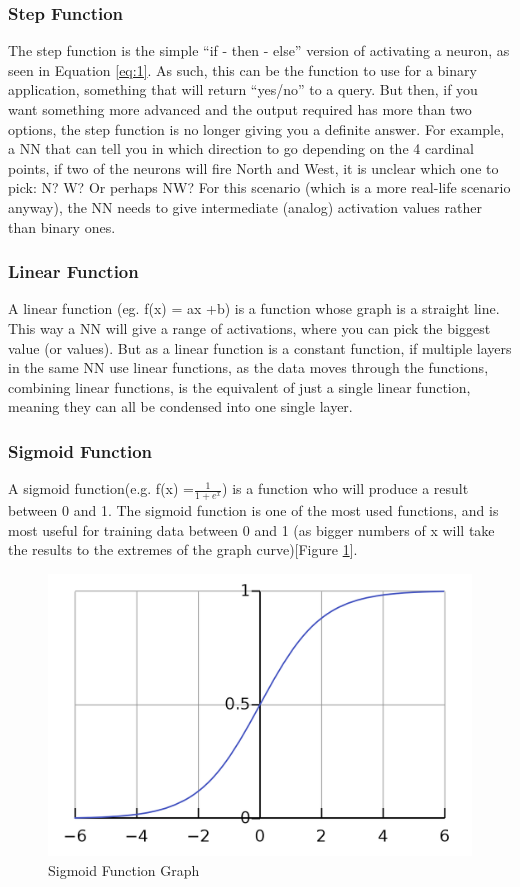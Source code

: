 \documentclass[12pt,a4paper]{article}
\begin{document}
\subsubsection{Step Function}
The step function is the simple “if - then - else” version of activating a neuron, as seen in Equation \ref{eq:1}. As such, this can be the function to use for a binary application,  something that will return “yes/no” to a query. But then, if you want something more advanced and the output required has more than two options, the step function is no longer giving you a definite answer. For example, a NN that can tell you in which direction to go depending on the 4 cardinal points, if two of the neurons will fire North and West, it is unclear which one to pick: N? W? Or perhaps NW? For this scenario (which is a more real-life scenario anyway), the NN needs to give intermediate (analog) activation values rather than binary ones. \cite{sharma_understanding_2017}
\subsubsection{Linear Function}
A linear function (eg. f(x) = ax +b) is a function whose graph is a straight line. This way a NN will give a range of activations, where you can pick the biggest value (or values). But as a linear function is a constant function, if multiple layers in the same NN use linear functions, as the data moves through the functions, combining linear functions, is the equivalent of just a single linear function, meaning they can all be condensed into one single layer.
\subsubsection{Sigmoid Function}
A sigmoid function(e.g. f(x) =\( \frac{1}{1+e^x} \)) is a function who will produce a result between 0 and 1. The sigmoid function is one of the most used functions, and is most useful for training data between 0 and 1 (as bigger numbers of x will take the results to the extremes of the graph curve)[Figure \ref{fig:3}].
\begin{figure}[ht]
	\includegraphics[width=\textwidth]{sigmoid}
	\centering
	\caption{Sigmoid Function Graph \protect \cite{nikhil_ketkar_deep_2017}}
	\label{fig:3}
\end{figure}
\end{document}
